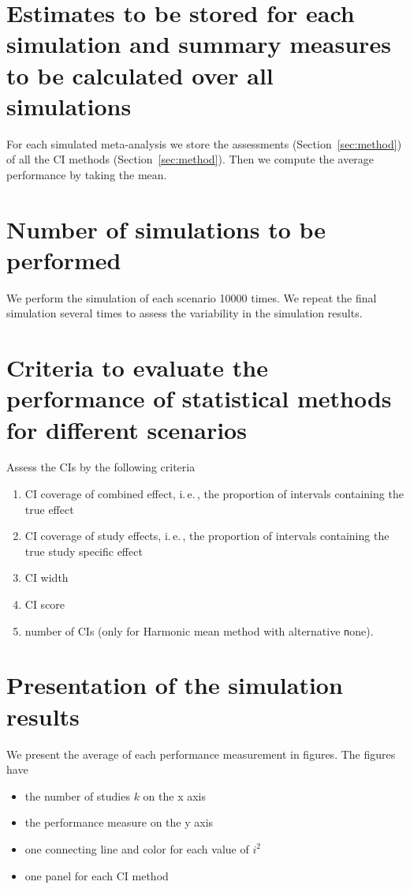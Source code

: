 \documentclass[letterpaper, 9pt]{article}
\newcommand{\ie}{{i.\,e.\,}}
\begin{document}
\section{Estimates to be stored for each simulation and summary measures to be calculated over all simulations}
For each simulated meta-analysis we store the assessments (Section~\ref{sec:method}) of all the CI methods (Section~\ref{sec:method}).
Then we compute the average performance by taking the mean.


\section{Number of simulations to be performed}
We perform the simulation of each scenario 10000 times.
We repeat the final simulation several times to assess the variability in the simulation results.


\section{Criteria to evaluate the performance of statistical methods for different scenarios}
Assess the CIs by the following criteria 
\begin{enumerate}
  \item CI coverage of combined effect, \ie, the proportion of intervals containing the true effect
  \item CI coverage of study effects, \ie, the proportion of intervals containing the true study specific effect
  \item CI width 
  \item CI score \cite{Gnei:Raft:07}
  \item number of CIs (only for Harmonic mean method with alternative {\texttt none}).
\end{enumerate}



\section{Presentation of the simulation results}
We present the average of each performance measurement in figures. The figures have
\begin{itemize}
\item the number of studies $k$ on the x axis
\item the performance measure on the y axis
\item one connecting line and color for each value of $i^2$
\item one panel for each CI method
\end{itemize}


\newpage


\end{document}
